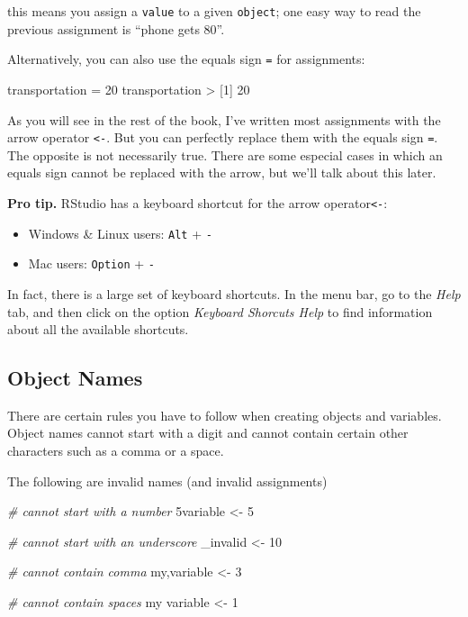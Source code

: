 \documentclass[
]{book}
\newenvironment{Shaded}{\begin{snugshade}}{\end{snugshade}}
\newcommand{\CommentTok}[1]{\textcolor[rgb]{0.56,0.35,0.01}{\textit{#1}}}
\newcommand{\DecValTok}[1]{\textcolor[rgb]{0.00,0.00,0.81}{#1}}
\newcommand{\NormalTok}[1]{#1}
\newcommand{\OtherTok}[1]{\textcolor[rgb]{0.56,0.35,0.01}{#1}}
\newcommand{\SpecialCharTok}[1]{\textcolor[rgb]{0.00,0.00,0.00}{#1}}
\begin{document}
this means you assign a \texttt{value} to a given \texttt{object}; one easy way to read the
previous assignment is ``phone gets 80''.

Alternatively, you can also use the equals sign \texttt{=} for assignments:

\begin{Shaded}
\begin{Highlighting}[]
\NormalTok{transportation }\OtherTok{=} \DecValTok{20}
\NormalTok{transportation}
\SpecialCharTok{\textgreater{}}\NormalTok{ [}\DecValTok{1}\NormalTok{] }\DecValTok{20}
\end{Highlighting}
\end{Shaded}

As you will see in the rest of the book, I've written most assignments with the
arrow operator \texttt{\textless{}-}. But you can perfectly replace them with the equals sign
\texttt{=}. The opposite is not necessarily true. There are some especial cases in
which an equals sign cannot be replaced with the arrow, but we'll talk about
this later.

\textbf{Pro tip.} RStudio has a keyboard shortcut for the arrow operator\texttt{\textless{}-}:

\begin{itemize}
\item
  Windows \& Linux users: \texttt{Alt} + \texttt{-}
\item
  Mac users: \texttt{Option} + \texttt{-}
\end{itemize}

In fact, there is a large set of keyboard shortcuts. In the menu bar, go to the
\emph{Help} tab, and then click on the option \emph{Keyboard Shorcuts Help} to find
information about all the available shortcuts.

\hypertarget{object-names}{%
\subsection{Object Names}\label{object-names}}

There are certain rules you have to follow when creating objects and variables.
Object names cannot start with a digit and cannot contain certain other characters
such as a comma or a space.

The following are invalid names (and invalid assignments)

\begin{Shaded}
\begin{Highlighting}[]
\CommentTok{\# cannot start with a number}
\NormalTok{5variable }\OtherTok{\textless{}{-}} \DecValTok{5}

\CommentTok{\# cannot start with an underscore}
\NormalTok{\_invalid }\OtherTok{\textless{}{-}} \DecValTok{10}

\CommentTok{\# cannot contain comma}
\NormalTok{my,variable }\OtherTok{\textless{}{-}} \DecValTok{3}

\CommentTok{\# cannot contain spaces}
\NormalTok{my variable }\OtherTok{\textless{}{-}} \DecValTok{1}
\end{Highlighting}
\end{Shaded}
\end{document}
